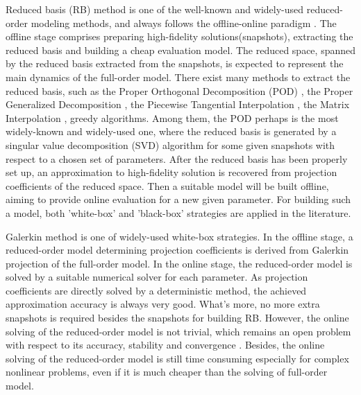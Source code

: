 \documentclass[preprint, 10pt]{elsarticle}
\begin{document}
Reduced basis (RB) method is one of the well-known and widely-used reduced-order modeling methods, and always follows the offline-online paradigm \cite{maday2006reduced}. The offline stage comprises preparing high-fidelity solutions(snapshots), extracting the reduced basis and building a cheap evaluation model. The reduced space, spanned by the reduced basis  extracted from the snapshots, is expected to represent the main dynamics of the full-order model. There exist many methods to extract the reduced basis, such as the Proper Orthogonal Decomposition (POD) \cite{hesthaven2016certified,liang2002proper,quarteroni2015reduced}, the  Proper Generalized Decomposition \cite{chinesta2011short}, the Piecewise Tangential Interpolation \cite{gallivan2002model}, the Matrix Interpolation \cite{panzer2010parametric}, greedy algorithms\cite{billaud2017dynamical, lappano2016greedy, hesthaven2014efficient}. Among them, the POD perhaps is the most widely-known and widely-used one, where the reduced basis is generated by a singular value decomposition (SVD) algorithm for some given snapshots with respect to a chosen set of parameters. After the reduced basis has been properly set up, an approximation to high-fidelity solution is recovered from projection coefficients of the reduced space. Then a suitable model will be built offline, aiming to provide online evaluation for a new given parameter.
For building such a model, both 'white-box' and 'black-box' strategies are applied in the literature.

Galerkin method \cite{rowley2004model, wang2020recurrent, deane1991low} is one of widely-used white-box strategies. In the offline stage,
a reduced-order model determining projection coefficients is derived from Galerkin projection of the full-order model. In the online stage, the reduced-order model is solved by a suitable numerical solver for each parameter.
As projection coefficients are directly solved by a deterministic method, the achieved approximation accuracy is always very good. What's more, no more extra snapshots is required besides the snapshots for building RB.
However, the online solving of the reduced-order model is not trivial, which remains an open problem with respect to its accuracy, stability and convergence \cite{huang2018challenges, iollo2000stability, rowley2004model}. Besides, the online solving of the reduced-order model is still time consuming especially for complex nonlinear problems, even if it is much cheaper than the solving of full-order model.

\end{document}
